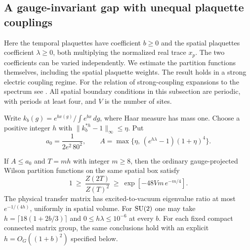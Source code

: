 \subsection{A gauge-invariant gap with unequal plaquette couplings}
\label{cl:sec:unequal}

Here the temporal plaquettes have coefficient $b\ge0$ and the spatial
plaquettes coefficient $\lambda\ge0$, both multiplying the normalized
real trace $x_p$. The two coefficients can be varied independently.
We estimate the partition functions themselves, including the spatial
plaquette weights. The result holds in a strong electric coupling regime.
For the relation of strong-coupling expansions to the spectrum see
\cite{Sei82,OSei78}. All spatial boundary conditions in this subsection
are periodic, with periods at least four, and $V$ is the number of sites.

Write $k_b(g)=e^{b x(g)}/\int e^{b x}\,dg$, where Haar measure has mass
one. Choose a positive integer $h$ with
$\|k_b^{*h}-1\|_\infty\le\eta$. Put
\[
 a_0=\frac{1}{2e^2\,80^2},\qquad
 A=\max\{\eta,\,(e^{h\lambda}-1)(1+\eta)^4\}.
\]
\begin{theorem}\label{cl:thm:unequal-gap}
If $A\le a_0$ and $T=mh$ with integer $m\ge8$, then the ordinary
gauge-projected Wilson partition functions on the same spatial box satisfy
\[
 1\ \ge\ \frac{Z(2T)}{Z(T)^2}\ \ge\ \exp[-48Vm\,e^{-m/4}].
\]
The physical transfer matrix has excited-to-vacuum eigenvalue ratio
at most $e^{-1/(4h)}$, uniformly in spatial volume. For $\mathrm{SU}(2)$ one
may take $h=\lceil18(1+2b/3)\rceil$ and $0\le h\lambda\le10^{-6}$
at every $b$. For each fixed compact connected matrix group, the same
conclusions hold with an explicit $h=O_G((1+b)^2)$ specified below.
\end{theorem}

